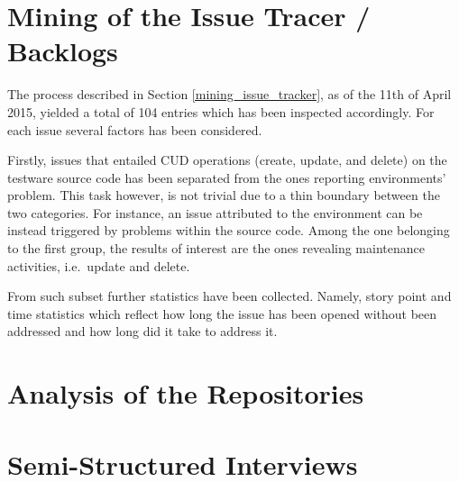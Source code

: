 \section{Mining of the Issue Tracer / Backlogs}


The process described in Section \ref{mining_issue_tracker}, as of the 11th of April 2015, yielded a total of 104 entries which has been inspected accordingly. For each issue several factors has been considered.

Firstly, issues that entailed CUD operations (create, update, and delete) on the testware source code has been separated from the ones reporting environments' problem. This task however, is not trivial due to a thin boundary between the two categories. For instance, an issue attributed to the environment can be instead triggered by problems within the source code. Among the one belonging to the first group, the results of interest are the ones revealing maintenance activities, i.e.\ update and delete.

From such subset further statistics have been collected. Namely, story point and time statistics which reflect how long the issue has been opened without been addressed and how long did it take to address it.




\section{Analysis of the Repositories}

\section{Semi-Structured Interviews}
